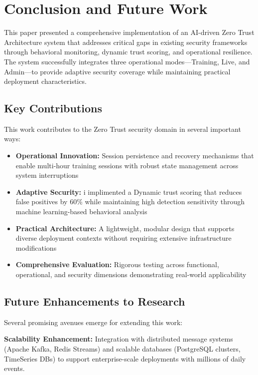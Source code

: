 \documentclass[conference]{IEEEtran}
\begin{document}
\section{Conclusion and Future Work}

This paper presented a comprehensive implementation of
an AI-driven Zero Trust Architecture system that addresses
critical gaps in existing security frameworks through behavioral monitoring, dynamic trust scoring, and operational
resilience. The system successfully integrates three operational
modes—Training, Live, and Admin—to provide adaptive
security coverage while maintaining practical deployment
characteristics.

\subsection{Key Contributions}
This work contributes to the Zero Trust security domain in several important ways:

\begin{itemize}[leftmargin=*]
  \item \textbf{Operational Innovation:} Session persistence and recovery
mechanisms that enable multi-hour training sessions with
robust state management across system interruptions
  \item \textbf{Adaptive Security:} i implimented a Dynamic trust scoring that reduces false positives by 60\% while maintaining high detection sensitivity through machine learning-based behavioral analysis
  \item \textbf{Practical Architecture:} A lightweight, modular design that supports diverse deployment contexts without requiring extensive infrastructure modifications
  \item \textbf{Comprehensive Evaluation:} Rigorous testing across functional, operational, and security dimensions demonstrating real-world applicability
\end{itemize}

\subsection{Future Enhancements to Research}
Several promising avenues emerge for extending this work:

\textbf{Scalability Enhancement:} Integration with distributed message systems (Apache Kafka, Redis Streams) and scalable databases (PostgreSQL clusters, TimeSeries DBs) to support enterprise-scale deployments with millions of daily events.
\end{document}
